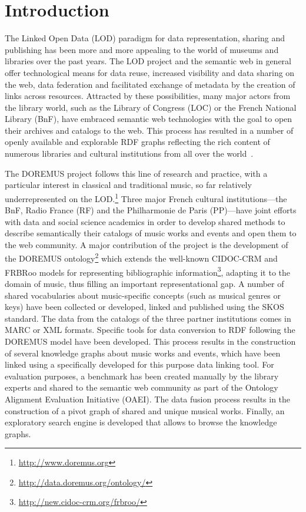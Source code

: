 \section{Introduction} \label{sec:intro}
The Linked Open Data (LOD) paradigm for data representation, sharing and publishing has been more and more appealing to the world of museums and libraries over the past years. The LOD project and the semantic web in general offer technological means for data reuse, increased visibility and data sharing on the web, data federation and facilitated exchange of metadata by the creation of links across resources. Attracted by these possibilities, many major actors from the library world, such as the Library of Congress (LOC) or the French National Library (BnF), have embraced semantic web technologies with the goal to open their archives and catalogs to the web. This process has resulted in a number of openly available and explorable RDF graphs reflecting the rich content of numerous libraries and cultural institutions from all over the world~\cite{marden2013linked}.

The DOREMUS project follows this line of research and practice, with a particular interest in classical and traditional music, so far relatively underrepresented on the LOD.\footnote{\url{http://www.doremus.org}} Three major French cultural institutions---the BnF, Radio France (RF) and the Philharmonie de Paris (PP)---have joint efforts with data and social science academics in order to develop shared methods to describe semantically their catalogs of music works and events and open them to the web community. A major contribution of the project is the development of the DOREMUS ontology\footnote{\url{http://data.doremus.org/ontology/}} which extends the well-known CIDOC-CRM and FRBRoo models for representing bibliographic information\footnote{\url{http://new.cidoc-crm.org/frbroo/}}, adapting it to the domain of music, thus filling an important representational gap. A number of shared vocabularies about music-specific concepts (such as musical genres or keys) have been collected or developed, linked and published using the SKOS standard. The data from the catalogs of the three partner institutions comes in MARC or XML  formats. Specific tools for data conversion to RDF following the DOREMUS model have been developed. This process results in the construction of several knowledge graphs about music works and events, which have been linked using a specifically developed for this purpose data linking tool. For evaluation purposes, a benchmark has been created manually by the library experts and shared to the semantic web community as part of the Ontology Alignment Evaluation Initiative (OAEI). The data fusion process results in the construction of a pivot graph of shared and unique musical works. Finally, an exploratory search engine is developed that allows to browse the knowledge graphs.

